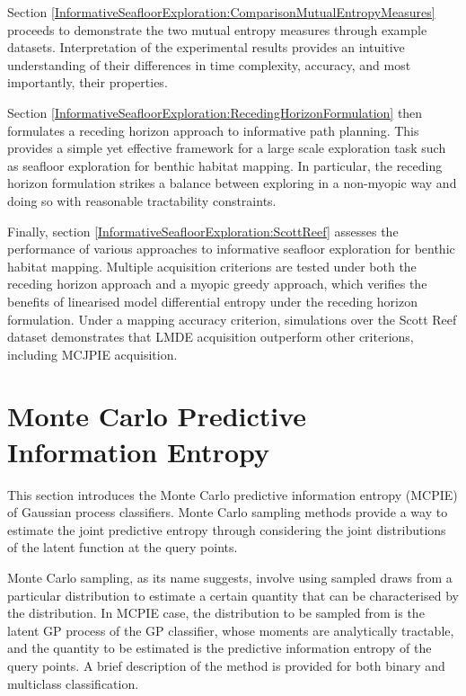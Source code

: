 	Section \ref{InformativeSeafloorExploration:ComparisonMutualEntropyMeasures} proceeds to demonstrate the two mutual entropy measures through example datasets. Interpretation of the experimental results provides an intuitive understanding of their differences in time complexity, accuracy, and most importantly, their properties.
	
	Section \ref{InformativeSeafloorExploration:RecedingHorizonFormulation} then formulates a receding horizon approach to informative path planning. This provides a simple yet effective framework for a large scale exploration task such as seafloor exploration for benthic habitat mapping. In particular, the receding horizon formulation strikes a balance between exploring in a non-myopic way and doing so with reasonable tractability constraints.
	
	Finally, section \ref{InformativeSeafloorExploration:ScottReef} assesses the performance of various approaches to informative seafloor exploration for benthic habitat mapping. Multiple acquisition criterions are tested under both the receding horizon approach and a myopic greedy approach, which verifies the benefits of linearised model differential entropy under the receding horizon formulation. Under a mapping accuracy criterion, simulations over the Scott Reef dataset demonstrates that LMDE acquisition outperform other criterions, including MCJPIE acquisition.
		
	\section{Monte Carlo Predictive Information Entropy}
	\label{InformativeSeafloorExploration:MCJPIE}
	
		This section introduces the Monte Carlo predictive information entropy (MCPIE) of Gaussian process classifiers. Monte Carlo sampling methods provide a way to estimate the joint predictive entropy through considering the joint distributions of the latent function at the query points.
	
		Monte Carlo sampling, as its name suggests, involve using sampled draws from a particular distribution to estimate a certain quantity that can be characterised by the distribution. In MCPIE case, the distribution to be sampled from is the latent GP process of the GP classifier, whose moments are analytically tractable, and the quantity to be estimated is the predictive information entropy of the query points. A brief description of the method is provided for both binary and multiclass classification.
		
